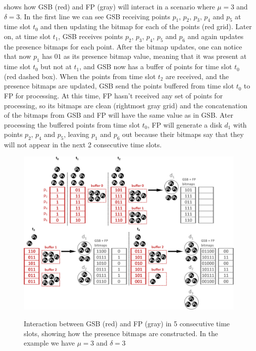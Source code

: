  shows how GSB (red) and FP (gray) will interact in a scenario where $\mu = 3$ and $\delta = 3$.
In the first line we can see GSB receiving points $p_1$, $p_2$, $p_3$, $p_4$ and $p_5$ at time slot $t_0$ and then
updating the bitmap for each of the points (red grid). Later on, at time slot $t_1$, GSB receives points $p_2$, $p_3$,
$p_4$, $p_5$ and $p_6$ and again updates the presence bitmaps for each point. After the bitmap updates, one can notice
that now $p_1$ has $01$ as its presence bitmap value, meaning that it was present at time slot $t_0$ but not at $t_1$,
and GSB now has a buffer of points for time slot $t_0$ (red dashed box). When the points from time slot $t_2$ are
received, and the presence bitmaps are updated, GSB send the points buffered from time slot $t_0$ to FP for processing.
At this time, FP hasn't received any set of points for processing, so its bitmaps are clean (rightmost gray grid) and
the concatenation of the bitmaps from GSB and FP will have the same value as in GSB. Ater processing the buffered points
from time slot $t_0$, FP will generate a disk $d_1$ with points $p_2$, $p_4$ and $p_5$, leaving $p_1$ and $p_6$ out
because their bitmaps say that they will not appear in the next 2 consecutive time slots.

\begin{figure}[h!]
    \centering
    \caption{Interaction between GSB (red) and FP (gray) in 5 consecutive time slots, showing how the presence bitmaps
        are constructed. In the example we have $\mu = 3$ and $\delta = 3$}
    \includegraphics[width=\linewidth]{images/gsb_fp_flow.png}
    \label{fig:gsb_fp_flow}
\end{figure}

